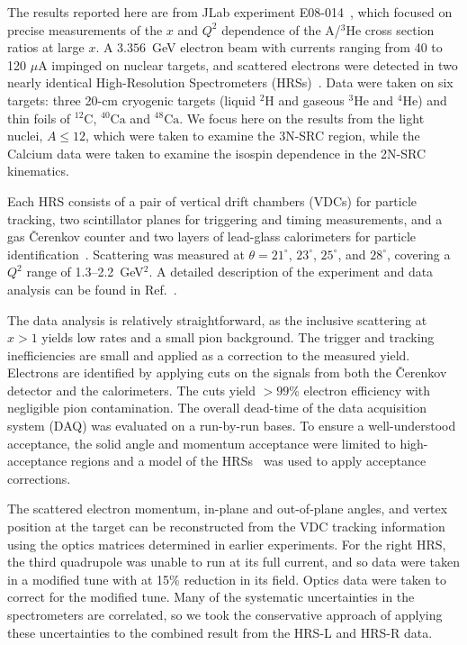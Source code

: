 The results reported here are from JLab experiment E08-014~\cite{e08014_pr}, which focused on precise
measurements of the $x$ and $Q^2$ dependence of the A/$^3$He cross section ratios at large $x$. A $3.356$~GeV
electron beam with currents ranging from 40 to 120 $\mu$A impinged on nuclear targets, and scattered
electrons were detected in two nearly identical High-Resolution Spectrometers (HRSs)~\cite{halla_nim}. Data
were taken on six targets: three 20-cm cryogenic targets (liquid $^2$H and gaseous $^3$He and $^4$He) and
thin foils of $\mathrm{^{12}C}$, $\mathrm{^{40}Ca}$ and $\mathrm{^{48}Ca}$. We focus here on the results from
the light nuclei, $A \leq 12$, which were taken to examine the 3N-SRC region, while the Calcium data were
taken to examine the isospin dependence in the 2N-SRC kinematics.

Each HRS consists of a pair of vertical drift chambers (VDCs) for particle tracking, two scintillator planes
for triggering and timing measurements, and a gas \v{C}erenkov counter and two layers of lead-glass
calorimeters for particle identification~\cite{halla_nim}. Scattering was measured at $\theta=21^\circ$,
$23^\circ$, $25^\circ$, and $28^\circ$, covering a $Q^2$ range of 1.3--2.2~GeV$^2$. A detailed description
of the experiment and data analysis can be found in Ref.~\cite{zye_thesis}.



The data analysis is relatively straightforward, as the inclusive scattering at $x>1$ yields low rates and a
small pion background. The trigger and tracking inefficiencies are small and applied as a correction to the
measured yield. Electrons are identified by applying cuts on the signals from both the \v{C}erenkov detector
and the calorimeters. The cuts yield $>99$\% electron efficiency with negligible pion contamination. The
overall dead-time of the data acquisition system (DAQ) was evaluated on a run-by-run bases. To ensure a
well-understood acceptance, the solid angle and momentum acceptance were limited to high-acceptance regions
and a model of the HRSs~\cite{zye_thesis} was used to apply acceptance corrections.

The scattered electron momentum, in-plane and out-of-plane angles, and vertex position at the target can be
reconstructed from the VDC tracking information using the optics matrices determined in earlier experiments.
For the right HRS, the third quadrupole was unable to run at its full current, and so data were taken in a
modified tune with at 15\% reduction in its field. Optics data were taken to correct for the modified
tune. Many of the systematic uncertainties in the spectrometers are correlated, so we took the
conservative approach of applying these uncertainties to the combined result from the HRS-L and HRS-R data.

